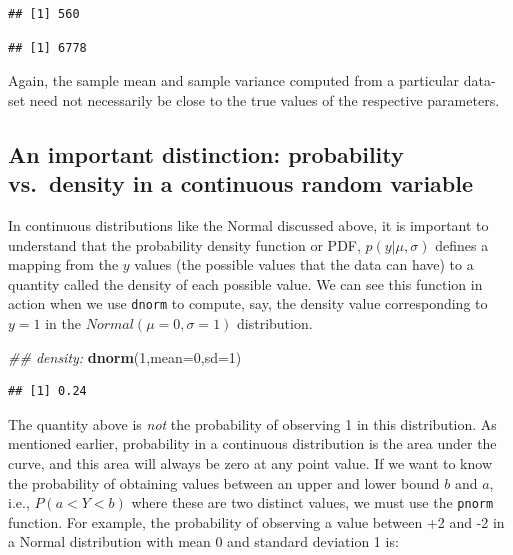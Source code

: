 \documentclass[12pt,]{krantz}
\newenvironment{Shaded}{\begin{snugshade}}{\end{snugshade}}
\newcommand{\CommentTok}[1]{\textcolor[rgb]{0.56,0.35,0.01}{\textit{#1}}}
\newcommand{\DataTypeTok}[1]{\textcolor[rgb]{0.13,0.29,0.53}{#1}}
\newcommand{\DecValTok}[1]{\textcolor[rgb]{0.00,0.00,0.81}{#1}}
\newcommand{\KeywordTok}[1]{\textcolor[rgb]{0.13,0.29,0.53}{\textbf{#1}}}
\newcommand{\NormalTok}[1]{#1}
\theoremstyle{definition}
\theoremstyle{definition}
\theoremstyle{definition}
\theoremstyle{remark}
\begin{document}
\begin{verbatim}
## [1] 560
\end{verbatim}

\begin{verbatim}
## [1] 6778
\end{verbatim}

Again, the sample mean and sample variance computed from a particular data-set need not necessarily be close to the true values of the respective parameters.

\hypertarget{an-important-distinction-probability-vs.density-in-a-continuous-random-variable}{%
\subsection{An important distinction: probability vs.~density in a continuous random variable}\label{an-important-distinction-probability-vs.density-in-a-continuous-random-variable}}

In continuous distributions like the Normal discussed above, it is important to understand that the probability density function or PDF, \(p(y| \mu, \sigma)\) defines a mapping from the \(y\) values (the possible values that the data can have) to a quantity called the density of each possible value. We can see this function in action when we use \texttt{dnorm} to compute, say, the density value corresponding to \(y=1\) in the \(Normal(\mu=0,\sigma=1)\) distribution.

\begin{Shaded}
\begin{Highlighting}[]
\CommentTok{## density:}
\KeywordTok{dnorm}\NormalTok{(}\DecValTok{1}\NormalTok{,}\DataTypeTok{mean=}\DecValTok{0}\NormalTok{,}\DataTypeTok{sd=}\DecValTok{1}\NormalTok{)}
\end{Highlighting}
\end{Shaded}

\begin{verbatim}
## [1] 0.24
\end{verbatim}

The quantity above is \emph{not} the probability of observing 1 in this distribution. As mentioned earlier, probability in a continuous distribution is the area under the curve, and this area will always be zero at any point value. If we want to know the probability of obtaining values between an upper and lower bound \(b\) and \(a\), i.e., \(P(a<Y<b)\) where these are two distinct values, we must use the \texttt{pnorm} function. For example, the probability of observing a value between +2 and -2 in a Normal distribution with mean 0 and standard deviation 1 is:
\end{document}
